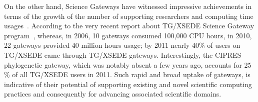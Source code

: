 \documentclass[]{svjour3}
\begin{document}


 









On the other hand, Science Gateways have witnessed impressive
achievements in terms of the growth of the number of supporting
researchers and computing time usages~\cite{gce11-nancy}. According to
the very recent report about TG/XSEDE Science Gateway
program~\cite{gce11-nancy}, whereas, in 2006, 10 gateways consumed
100,000 CPU hours, in 2010, 22 gateways provided 40 million hours
usage; by 2011 nearly 40\% of users on TG/XSEDE came through TG/XSEDE
gateways. Interestingly, the CIPRES phylogenetic gateway, which was
notably absent a few years ago, accounts for 25 \% of all TG/XSEDE
users in 2011. Such rapid and broad uptake of gateways, is indicative
of their potential of supporting existing and novel scientific
computing practices and consequently for advancing associated
scientific domains.
\end{document}
